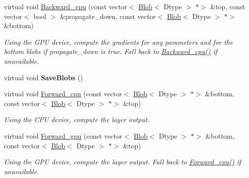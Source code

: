 \begin{DoxyCompactItemize}
\mbox{\label{classcaffe_1_1_h_d_f5_output_layer_a7b6f29bc5aaaf64bf90206c01f34ac4f}} 
virtual void \mbox{\hyperlink{classcaffe_1_1_h_d_f5_output_layer_a7b6f29bc5aaaf64bf90206c01f34ac4f}{Backward\+\_\+gpu}} (const vector$<$ \mbox{\hyperlink{classcaffe_1_1_blob}{Blob}}$<$ Dtype $>$ $\ast$$>$ \&top, const vector$<$ bool $>$ \&propagate\+\_\+down, const vector$<$ \mbox{\hyperlink{classcaffe_1_1_blob}{Blob}}$<$ Dtype $>$ $\ast$$>$ \&bottom)
\begin{DoxyCompactList}\small\item\em Using the G\+PU device, compute the gradients for any parameters and for the bottom blobs if propagate\+\_\+down is true. Fall back to \mbox{\hyperlink{classcaffe_1_1_h_d_f5_output_layer_a1acb4098d879c5fb6646ef097ef15713}{Backward\+\_\+cpu()}} if unavailable. \end{DoxyCompactList}\item 
\mbox{\label{classcaffe_1_1_h_d_f5_output_layer_a56c7ba8e69d0867d550dddd928863a2f}} 
virtual void {\bfseries Save\+Blobs} ()
\item 
\mbox{\label{classcaffe_1_1_h_d_f5_output_layer_a6b2ac258b0a9222232d91c43bfda1555}} 
virtual void \mbox{\hyperlink{classcaffe_1_1_h_d_f5_output_layer_a6b2ac258b0a9222232d91c43bfda1555}{Forward\+\_\+cpu}} (const vector$<$ \mbox{\hyperlink{classcaffe_1_1_blob}{Blob}}$<$ Dtype $>$ $\ast$$>$ \&bottom, const vector$<$ \mbox{\hyperlink{classcaffe_1_1_blob}{Blob}}$<$ Dtype $>$ $\ast$$>$ \&top)
\begin{DoxyCompactList}\small\item\em Using the C\+PU device, compute the layer output. \end{DoxyCompactList}\item 
\mbox{\label{classcaffe_1_1_h_d_f5_output_layer_a01983e66527c733011027e86186f0268}} 
virtual void \mbox{\hyperlink{classcaffe_1_1_h_d_f5_output_layer_a01983e66527c733011027e86186f0268}{Forward\+\_\+gpu}} (const vector$<$ \mbox{\hyperlink{classcaffe_1_1_blob}{Blob}}$<$ Dtype $>$ $\ast$$>$ \&bottom, const vector$<$ \mbox{\hyperlink{classcaffe_1_1_blob}{Blob}}$<$ Dtype $>$ $\ast$$>$ \&top)
\begin{DoxyCompactList}\small\item\em Using the G\+PU device, compute the layer output. Fall back to \mbox{\hyperlink{classcaffe_1_1_h_d_f5_output_layer_a9bab1f9fd935b4e5f90e6cdb2e86c8c3}{Forward\+\_\+cpu()}} if unavailable. \end{DoxyCompactList}\item 

\end{DoxyCompactItemize}
